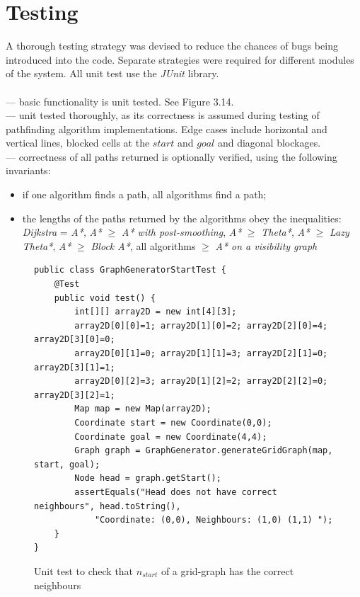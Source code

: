 \documentclass[12pt,notitlepage]{report}
\begin{document}
\section{Testing}

A thorough testing strategy was devised to reduce the chances of bugs being introduced into the code. Separate strategies were required for different modules of the system. All unit test use the {\em JUnit} library.\\

\\

 --- basic functionality is unit tested. See Figure 3.14.\\

 --- unit tested thoroughly, as its correctness is assumed during testing of pathfinding algorithm implementations. Edge cases include horizontal and vertical lines, blocked cells at the $start$ and $goal$ and diagonal blockages.\\

 --- correctness of all paths returned is optionally verified, using the following invariants:
  \begin{itemize}
  \item if one algorithm finds a path, all algorithms find a path;
  \item the lengths of the paths returned by the algorithms obey the inequalities: {\em Dijkstra} = {\em A*}, {\em A*} $\geq$ {\em A* with post-smoothing}, {\em A*} $\geq$ {\em Theta*}, {\em A*} $\geq$ {\em Lazy Theta*}, {\em A*} $\geq$ {\em Block A*}, all algorithms $\geq$ {\em A* on a visibility graph}
  \end{itemize}  
  
  \begin{figure}
\begin{lstlisting}
public class GraphGeneratorStartTest {
	@Test
	public void test() {
		int[][] array2D = new int[4][3];
		array2D[0][0]=1; array2D[1][0]=2; array2D[2][0]=4; array2D[3][0]=0;
		array2D[0][1]=0; array2D[1][1]=3; array2D[2][1]=0; array2D[3][1]=1;
		array2D[0][2]=3; array2D[1][2]=2; array2D[2][2]=0; array2D[3][2]=1;
		Map map = new Map(array2D);
		Coordinate start = new Coordinate(0,0);
		Coordinate goal = new Coordinate(4,4);
		Graph graph = GraphGenerator.generateGridGraph(map, start, goal);
		Node head = graph.getStart();
		assertEquals("Head does not have correct neighbours", head.toString(), 
			"Coordinate: (0,0), Neighbours: (1,0) (1,1) ");
	}
}
\end{lstlisting}
\caption{Unit test to check that $n_{start}$ of a grid-graph has the correct neighbours}
\end{figure}
  
\end{document}
